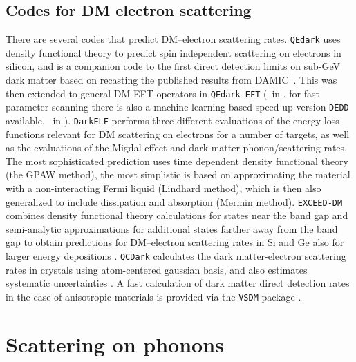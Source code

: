 \subsection{Codes for DM electron scattering}
There are several codes that predict DM--electron scattering rates.
{\tt QEdark} uses density functional theory to predict spin independent scattering on electrons in silicon, and is a companion code to the first direct detection limits on sub-GeV dark matter based on recasting the published results from DAMIC~\cite{QEdark}. This was then extended to general DM EFT operators in {\tt QEdark-EFT} (~in \cite{DM:electron:EFT}, for fast parameter scanning there is also a machine learning based speed-up version {\tt DEDD} available, ~in \cite{DM:electron:EFT}). 
{\tt DarkELF} \cite{darkELF} performs three different evaluations of the energy loss functions relevant for DM scattering on electrons for a number of targets, as well as the evaluations of the Migdal effect and dark matter phonon/scattering rates. The most sophisticated prediction uses time dependent density functional theory (the GPAW method), the most simplistic is based on approximating the  material with a non-interacting Fermi liquid  (Lindhard method), which is then also generalized to include dissipation and absorption (Mermin method).  {\tt EXCEED-DM} combines density functional theory calculations for states near the band gap and semi-analytic approximations for additional states farther away from the band gap to obtain predictions for DM--electron scattering rates in Si and Ge also for larger energy depositions \cite{Exceed-DM}.  {\tt QCDark} calculates the dark matter-electron scattering rates in crystals using atom-centered gaussian basis, and also estimates systematic uncertainties \cite{QCDark}.  A fast calculation of dark matter direct detection rates in the case of anisotropic materials is provided via the {\tt VSDM} package \cite{VSDM}.


\section{Scattering on phonons}
\label{sec:phonons}

